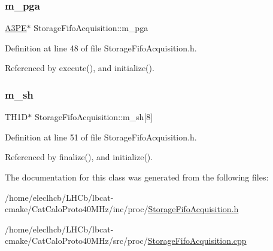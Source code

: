 \subsubsection{\texorpdfstring{m\+\_\+pga}{m\_pga}}
{\footnotesize\ttfamily \hyperlink{classA3PE}{A3\+PE}$\ast$ Storage\+Fifo\+Acquisition\+::m\+\_\+pga\hspace{0.3cm}{\ttfamily [private]}}



Definition at line 48 of file Storage\+Fifo\+Acquisition.\+h.



Referenced by execute(), and initialize().

\mbox{\label{classStorageFifoAcquisition_ace3efa07a424f66783388ad073b31830}} 
\subsubsection{\texorpdfstring{m\+\_\+sh}{m\_sh}}
{\footnotesize\ttfamily T\+H1D$\ast$ Storage\+Fifo\+Acquisition\+::m\+\_\+sh\mbox{[}8\mbox{]}\hspace{0.3cm}{\ttfamily [private]}}



Definition at line 51 of file Storage\+Fifo\+Acquisition.\+h.



Referenced by finalize(), and initialize().



The documentation for this class was generated from the following files\+:\begin{DoxyCompactItemize}
\item 
/home/eleclhcb/\+L\+H\+Cb/lbcat-\/cmake/\+Cat\+Calo\+Proto40\+M\+Hz/inc/proc/\hyperlink{StorageFifoAcquisition_8h}{Storage\+Fifo\+Acquisition.\+h}\item 
/home/eleclhcb/\+L\+H\+Cb/lbcat-\/cmake/\+Cat\+Calo\+Proto40\+M\+Hz/src/proc/\hyperlink{StorageFifoAcquisition_8cpp}{Storage\+Fifo\+Acquisition.\+cpp}\end{DoxyCompactItemize}
